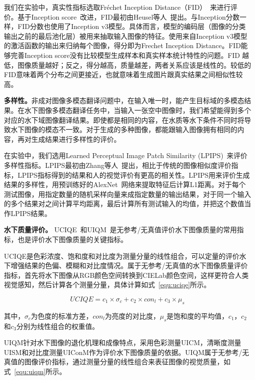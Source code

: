 我们在实验中，真实性指标选取Fréchet Inception Distance（FID）~\cite{heusel2017gans}来进行评价。基于Inception score~\cite{salimans2016improved}改进，FID最初由Heusel等人~\cite{heusel2017gans}提出。与Inception分数一样，FID分数也使用了Inception v3模型。具体而言，模型的编码层（图像的分类输出之前的最后池化层）被用来抽取输入图像的特征。使用来自Inception v3模型的激活函数的输出来归纳每个图像，得分即为Frechet Inception Distance。FID能够完善Inception score没有比较模型生成样本和真实样本统计特性的问题。FID 越低，图像质量越好；反之，得分越高，质量越差，两者关系应该是线性的。较低的FID意味着两个分布之间更接近，也就意味着生成图片跟真实结果之间相似性较高。

\textbf{多样性。}非成对图像多模态翻译问题中，在输入唯一时，能产生目标域的多模态结果。在水下图像多模态翻译任务中，当输入一张空中图像时，我们希望能得到多个对应的水下域图像翻译结果。即使都是相同的内容，在水质等水下条件不同时将导致水下图像的模态不一致。对于生成的多种图像，都能跟输入图像拥有相同的内容，再对生成结果进行多样性的评价。

在实验中，我们选用Learned Perceptual Image Patch Similarity (LPIPS)~\cite{zhang2018perceptual}来评价多样性指标。LPIPS最初由Zhang等人~\cite{zhang2018perceptual}提出，相比于传统的图像相似度评价指标，LPIPS指标得到的结果和人的视觉评价有更高的相关性。LPIPS用来评价生成结果的多样性，用预训练好的AlexNet~\cite{krizhevsky2017imagenet}网络来提取特征后计算L1距离。对于每个测试图像，用指定数量的随机采样向量来成指定数量的输出结果，对于同一个输入的多个结果对之间计算平均距离，最后计算所有测试输入的均值，并把这个数值当作LPIPS结果。

\textbf{水下质量评价。}
UCIQE~\cite{yang2015underwater}和UIQM~\cite{panetta2015human}是无参考/无真值评价水下图像质量的常用指标，也是评价水下图像质量的关键指标。

UCIQE是色彩浓度、饱和度和对比度为测量分量的线性组合，可以定量的评价水下增强结果的色偏、模糊和对比度情况。属于无参考/无真值的水下图像质量评价指标，首先将水下图像从RGB颜色空间转换到CIELab颜色空间，这样更符合人类视觉感知，然后计算各个测量分量，具体计算如式~\ref{equ:uciqe}所示。

\begin{equation}
\label{equ:uciqe}
UCIQE = c_1 \times \sigma_c + c_2 \times con_l + c_3 \times \mu_s
\end{equation}

其中，$ \sigma_c$为色度的标准方差，$con_l$为亮度的对比度，$\mu_s$是饱和度的平均值，$c_1$，$c_2$和$c_3$分别为线性组合的权重值。

UIQM针对水下图像的退化机理和成像特点，采用色彩测量UICM，清晰度测量UISM和对比度测量UIConM作为评价水下图像质量的依据。UIQM属于无参考/无真值的图像评价指标，通过测量分量的线性组合来表征图像的视觉质量，如式~\ref{equ:uiqm}所示。

